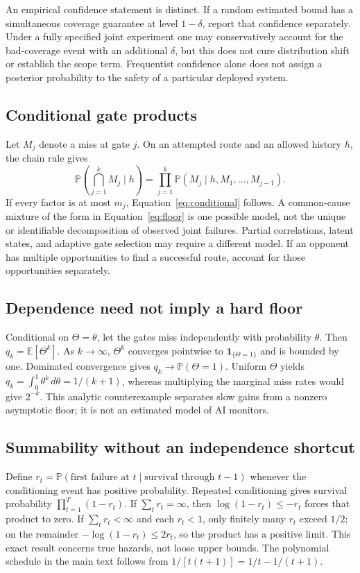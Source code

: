 \documentclass[10pt,twocolumn,letterpaper]{article}
\newcommand{\Prb}{\mathbb P}
\newcommand{\Exp}{\mathbb E}
\begin{document}
An empirical confidence statement is distinct. If a random estimated bound has a simultaneous coverage guarantee at level $1-\delta$, report that confidence separately. Under a fully specified joint experiment one may conservatively account for the bad-coverage event with an additional $\delta$, but this does not cure distribution shift or establish the scope term. Frequentist confidence alone does not assign a posterior probability to the safety of a particular deployed system.

\subsection{Conditional gate products}
Let $M_j$ denote a miss at gate $j$. On an attempted route and an allowed history $h$, the chain rule gives
\[
\Prb\!\left(\bigcap_{j=1}^k M_j\mid h\right)
=\prod_{j=1}^k\Prb(M_j\mid h,M_1,\ldots,M_{j-1}).
\]
If every factor is at most $m_j$, Equation~\eqref{eq:conditional} follows. A common-cause mixture of the form in Equation~\eqref{eq:floor} is one possible model, not the unique or identifiable decomposition of observed joint failures. Partial correlations, latent states, and adaptive gate selection may require a different model. If an opponent has multiple opportunities to find a successful route, account for those opportunities separately.

\subsection{Dependence need not imply a hard floor}
\label{app:dependence}
Conditional on $\Theta=\theta$, let the gates miss independently with probability $\theta$. Then $q_k=\Exp[\Theta^k]$. As $k\to\infty$, $\Theta^k$ converges pointwise to $\mathbf1_{\{\Theta=1\}}$ and is bounded by one. Dominated convergence gives $q_k\to\Prb(\Theta=1)$. Uniform $\Theta$ yields $q_k=\int_0^1\theta^k\,d\theta=1/(k+1)$, whereas multiplying the marginal miss rates would give $2^{-k}$. This analytic counterexample separates slow gains from a nonzero asymptotic floor; it is not an estimated model of AI monitors.

\subsection{Summability without an independence shortcut}
Define $r_t=\Prb(\text{first failure at }t\mid\text{survival through }t-1)$ whenever the conditioning event has positive probability. Repeated conditioning gives survival probability $\prod_{t=1}^{T}(1-r_t)$. If $\sum_t r_t=\infty$, then $\log(1-r_t)\le-r_t$ forces that product to zero. If $\sum_t r_t<\infty$ and each $r_t<1$, only finitely many $r_t$ exceed $1/2$; on the remainder $-\log(1-r_t)\le2r_t$, so the product has a positive limit. This exact result concerns true hazards, not loose upper bounds. The polynomial schedule in the main text follows from $1/[t(t+1)]=1/t-1/(t+1)$.
\end{document}
